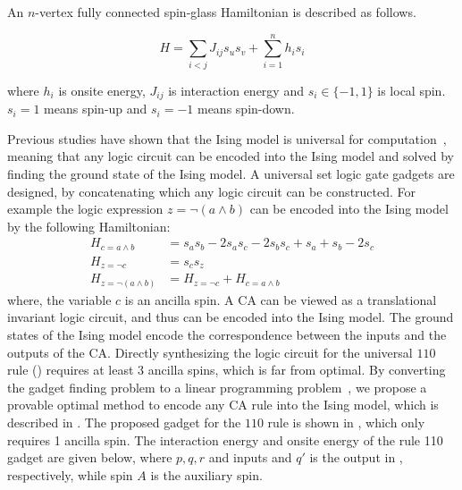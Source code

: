 \documentclass[twocolumn,superscriptaddress,english,showpacs,longbibliography]{revtex4-2}
\begin{document}
An $n$-vertex fully connected spin-glass Hamiltonian is described as follows.

\begin{equation}
H = \sum_{i < j} J_{ij}s_us_v + \sum_{i=1}^{n}h_i s_i
\end{equation}

where $h_i$ is onsite energy, $J_{ij}$ is interaction energy and
$s_i \in \{-1, 1\}$ is local spin. $s_i=1$ means spin-up and $s_i=-1$ means spin-down.

Previous studies have shown that the Ising model is universal for computation~\cite{Aadit2022, onizawa2020design, camsari2017stochastic}, meaning that any logic circuit can be encoded into the Ising model and solved by finding the ground state of the Ising model. A universal set logic gate gadgets are designed, by concatenating which any logic circuit can be constructed.
For example the logic expression $z = \neg (a \land b)$ can be encoded into the Ising model by the following Hamiltonian:
\begin{equation}
    \begin{split}
        H_{c = a \land b} &= s_a s_b -2 s_a s_c -2 s_bs_c + s_a + s_b -2 s_c\\
        H_{z = \neg c} &= s_c s_z\\
        H_{z = \neg (a \land b)} &= H_{z = \neg c} + H_{c = a \land b}
    \end{split}
\end{equation}
where, the variable $c$ is an ancilla spin.
A CA can be viewed as a translational invariant logic circuit, and thus can be encoded into the Ising model. The ground states of the Ising model encode the correspondence between the inputs and the outputs of the CA.
Directly synthesizing the logic circuit for the universal $110$ rule () requires at least 3 ancilla spins, which is far from optimal. By converting the gadget finding problem to a linear programming problem~\cite{Kolman1995}, we propose a provable optimal method to encode any CA rule into the Ising model, which is described in .
The proposed gadget for the $110$ rule is shown in , which only requires 1 ancilla spin.
The interaction energy and onsite energy of the rule 110 gadget are given below, where $p, q, r$ and inputs and $q'$ is the output in , respectively, while spin $A$ is the auxiliary spin.
\end{document}
